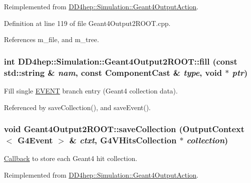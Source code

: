Reimplemented from \hyperlink{class_d_d4hep_1_1_simulation_1_1_geant4_output_action_a1d83299b79de6a1a75e70ef5a9e4d3eb}{DD4hep::Simulation::Geant4OutputAction}.

Definition at line 119 of file Geant4Output2ROOT.cpp.

References m\_\-file, and m\_\-tree.\hypertarget{class_d_d4hep_1_1_simulation_1_1_geant4_output2_r_o_o_t_a2814387feba0de7236578876ad2f1981}{
\subsubsection[{fill}]{\setlength{\rightskip}{0pt plus 5cm}int DD4hep::Simulation::Geant4Output2ROOT::fill (const std::string \& {\em nam}, \/  const {\bf ComponentCast} \& {\em type}, \/  void $\ast$ {\em ptr})}}
\label{class_d_d4hep_1_1_simulation_1_1_geant4_output2_r_o_o_t_a2814387feba0de7236578876ad2f1981}


Fill single \hyperlink{namespace_e_v_e_n_t}{EVENT} branch entry (Geant4 collection data). 

Referenced by saveCollection(), and saveEvent().\hypertarget{class_d_d4hep_1_1_simulation_1_1_geant4_output2_r_o_o_t_a1f61031bde79ed84a62145cb32ac4428}{
\subsubsection[{saveCollection}]{\setlength{\rightskip}{0pt plus 5cm}void Geant4Output2ROOT::saveCollection ({\bf OutputContext}$<$ G4Event $>$ \& {\em ctxt}, \/  {\bf G4VHitsCollection} $\ast$ {\em collection})}}
\label{class_d_d4hep_1_1_simulation_1_1_geant4_output2_r_o_o_t_a1f61031bde79ed84a62145cb32ac4428}


\hyperlink{class_d_d4hep_1_1_callback}{Callback} to store each Geant4 hit collection. 

Reimplemented from \hyperlink{class_d_d4hep_1_1_simulation_1_1_geant4_output_action_aa43d1f01dbcb11ac1d937a878d87a90f}{DD4hep::Simulation::Geant4OutputAction}.

